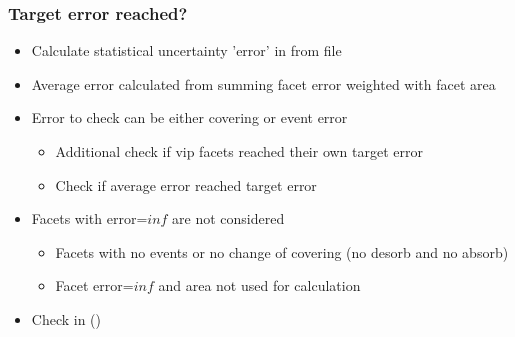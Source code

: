\subsubsection{Target error reached?}
\begin{itemize}[noitemsep,topsep=0pt, partopsep=0pt]
\item Calculate statistical uncertainty 'error' in  from  file
\item Average error calculated from summing facet error weighted with facet area
\item Error to check can be either covering or event error
\begin{itemize}[noitemsep,topsep=0pt, partopsep=0pt]
\item Additional check if vip facets reached their own target error
\item Check if average error reached target error
\end{itemize}
\item Facets with error=$inf$ are not considered
\begin{itemize}[noitemsep,topsep=0pt, partopsep=0pt]
\item Facets with no events or no change of covering (no desorb and no absorb)
\item Facet error=$inf$ and area not used for calculation
\end{itemize}
\item Check in  ()
\end{itemize}

